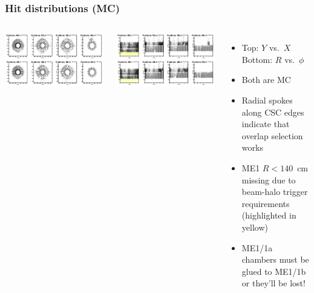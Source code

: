\documentclass[compress]{beamer}
\begin{document}
\begin{frame}
\frametitle{Hit distributions (MC)}

\begin{columns}
\includegraphics[width=\linewidth]{MCBeamHalo_positions1.png}

\includegraphics[width=\linewidth]{MCBeamHalo_positions2.png}

\begin{itemize}
\item Top: $Y$ vs.\ $X$ \\ Bottom: $R$ vs.\ $\phi$

\item Both are MC

\item Radial spokes along CSC edges indicate that overlap selection works

\item ME1 $R < 140$~cm missing due to beam-halo
  trigger requirements (highlighted in yellow)

\item ME1/1a chambers must be glued to ME1/1b or they'll be lost!
\end{itemize}
\end{columns}
\end{frame}
\end{document}

